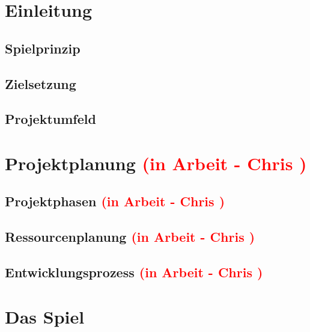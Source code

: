 \documentclass{article}
\begin{document}



\newpage

\tableofcontents

\newpage
	
\section{Einleitung}

\vspace{2cm}
\subsection{Spielprinzip}

\vspace{2cm}
\subsection{Zielsetzung}

\vspace{2cm}
\subsection{Projektumfeld}


\newpage
\section{Projektplanung \textcolor{red}{(in Arbeit - Chris )}}


\vspace{2cm}
\subsection{Projektphasen  \textcolor{red}{(in Arbeit - Chris )}}

\vspace{2cm}
\subsection{Ressourcenplanung  \textcolor{red}{(in Arbeit - Chris )}}

\vspace{2cm}
\subsection{Entwicklungsprozess  \textcolor{red}{(in Arbeit - Chris )}}

\newpage
\section{Das Spiel}
\end{document}

